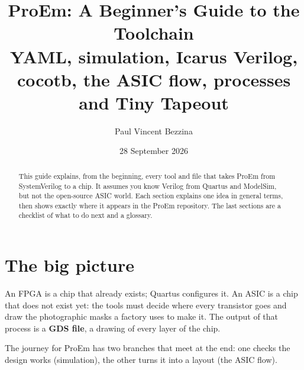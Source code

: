 \documentclass[11pt,a4paper]{article}
\title{\color{accent}\textbf{ProEm: A Beginner's Guide to the Toolchain}\\[4pt]
\large YAML, simulation, Icarus Verilog, cocotb, the ASIC flow, processes and Tiny Tapeout}
\author{Paul Vincent Bezzina}
\date{28 September 2026}
\newcommand{\file}[1]{\texttt{#1}}
\begin{document}
\maketitle

\begin{abstract}
This guide explains, from the beginning, every tool and file that takes ProEm from SystemVerilog to a chip. It assumes you know Verilog from Quartus and ModelSim, but not the open-source ASIC world. Each section explains one idea in general terms, then shows exactly where it appears in the ProEm repository. The last sections are a checklist of what to do next and a glossary.
\end{abstract}

\tableofcontents
\newpage

\section{The big picture}

An FPGA is a chip that already exists; Quartus configures it. An ASIC is a chip that does not exist yet: the tools must decide where every transistor goes and draw the photographic masks a factory uses to make it. The output of that process is a \textbf{GDS file}, a drawing of every layer of the chip.

The journey for ProEm has two branches that meet at the end: one checks the design works (simulation), the other turns it into a layout (the ASIC flow).

\begin{center}
\end{center}
\end{document}
